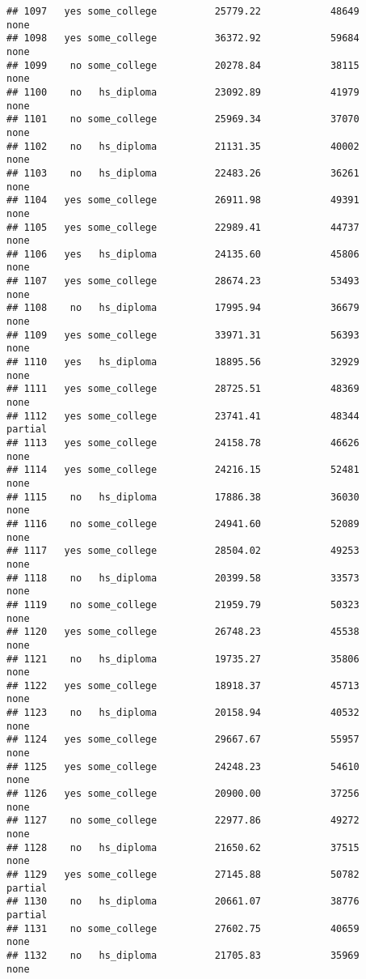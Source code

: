 \documentclass[
]{article}
\begin{document}
\begin{verbatim}
## 1097   yes some_college          25779.22            48649        none
## 1098   yes some_college          36372.92            59684        none
## 1099    no some_college          20278.84            38115        none
## 1100    no   hs_diploma          23092.89            41979        none
## 1101    no some_college          25969.34            37070        none
## 1102    no   hs_diploma          21131.35            40002        none
## 1103    no   hs_diploma          22483.26            36261        none
## 1104   yes some_college          26911.98            49391        none
## 1105   yes some_college          22989.41            44737        none
## 1106   yes   hs_diploma          24135.60            45806        none
## 1107   yes some_college          28674.23            53493        none
## 1108    no   hs_diploma          17995.94            36679        none
## 1109   yes some_college          33971.31            56393        none
## 1110   yes   hs_diploma          18895.56            32929        none
## 1111   yes some_college          28725.51            48369        none
## 1112   yes some_college          23741.41            48344     partial
## 1113   yes some_college          24158.78            46626        none
## 1114   yes some_college          24216.15            52481        none
## 1115    no   hs_diploma          17886.38            36030        none
## 1116    no some_college          24941.60            52089        none
## 1117   yes some_college          28504.02            49253        none
## 1118    no   hs_diploma          20399.58            33573        none
## 1119    no some_college          21959.79            50323        none
## 1120   yes some_college          26748.23            45538        none
## 1121    no   hs_diploma          19735.27            35806        none
## 1122   yes some_college          18918.37            45713        none
## 1123    no   hs_diploma          20158.94            40532        none
## 1124   yes some_college          29667.67            55957        none
## 1125   yes some_college          24248.23            54610        none
## 1126   yes some_college          20900.00            37256        none
## 1127    no some_college          22977.86            49272        none
## 1128    no   hs_diploma          21650.62            37515        none
## 1129   yes some_college          27145.88            50782     partial
## 1130    no   hs_diploma          20661.07            38776     partial
## 1131    no some_college          27602.75            40659        none
## 1132    no   hs_diploma          21705.83            35969        none

\end{verbatim}
\end{document}

